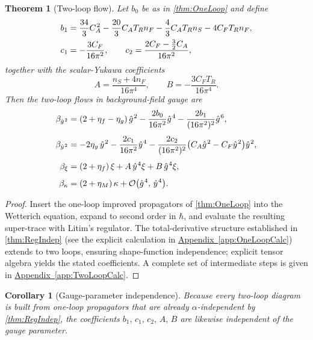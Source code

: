 \documentclass[pdflatex,sn-mathphys-num]{sn-jnl}
\theoremstyle{thmstyleone}
\newtheorem{theorem}{Theorem}
\newtheorem{corollary}{Corollary}
\theoremstyle{thmstyletwo}%
\theoremstyle{thmstylethree}%
\newcommand{\sm}{\hspace{.065em}}
\newcommand{\appref}[1]{\hyperref[#1]{Appendix~\ref*{#1}}}
\newcommand{\smexp}[1]{^{\sm #1}}
\begin{document}
\begin{theorem}[Two-loop flow]\label{thm:TwoLoop}
Let \(b_{0}\) be as in \autoref{thm:OneLoop} and define
\[
  \begin{aligned}
  &b_{1}
  =\frac{34}{3}C_{A}\smexp{2}
   -\frac{20}{3}C_{A}T_{R}n_{F}
   -\frac43 C_{A}T_{R}n_{S}
   -4C_{F}T_{R}n_{F},\\
  &c_{1}=-\frac{3C_{F}}{16\pi^{2}},\qquad
  c_{2}=\frac{2C_{F}-\tfrac32 C_{A}}{16\pi^{2}},
  \end{aligned}
\]
together with the scalar-Yukawa coefficients
\[
  A=\frac{n_{S}+4n_{F}}{16\pi^{4}},\qquad
  B=-\frac{3C_{F}T_{R}}{16\pi^{4}}.
\]
Then the two-loop flows in background-field gauge are
\begin{equation}\label{eq:beta_g_two}
  \begin{aligned}
  \beta_{\hat g\smexp{2}}
    &=(2+\eta_{f}-\eta_{g})\,\hat g\smexp{2}
      -\frac{2b_{0}}{16\pi^{2}}\hat g\smexp{4}
      -\frac{2b_{1}}{(16\pi^{2})^{2}}\hat g\smexp{6},\\[4pt]
  \beta_{\hat y\smexp{2}}
    &=-2\eta_{y}\,\hat y\smexp{2}
      -\frac{2c_{1}}{16\pi^{2}}\hat y\smexp{4}
      -\frac{2c_{2}}{(16\pi^{2})^{2}}
         \bigl(C_{A}\hat g\smexp{2}-C_{F}\hat y\smexp{2}\bigr)\hat y\smexp{2},
  \\[4pt]
  \beta_{\xi}
    &=(2+\eta_{f})\,\xi
      +A\,\hat y\smexp{4}\xi
      +B\,\hat g\smexp{4}\xi,
  \\[4pt]
  \beta_{\kappa}
    &=(2+\eta_{M})\,\kappa
      +\mathcal O\bigl(\hat g\smexp{4},\,\hat y\smexp{4}\bigr).
  \end{aligned}
\end{equation}
\end{theorem}

\begin{proof}
Insert the one-loop improved propagators of
\autoref{thm:OneLoop} into the Wetterich equation, expand to second order
in \(\hbar\), and evaluate the resulting super-trace with Litim's
regulator.  The total-derivative structure established in
\autoref{thm:RegIndep} (see the explicit calculation in
\appref{app:OneLoopCalc}) extends to two loops, ensuring
shape-function independence; explicit tensor algebra yields the stated
coefficients.  A complete set of intermediate steps is given in
\appref{app:TwoLoopCalc}.
\end{proof}

\begin{corollary}[Gauge-parameter independence]
Because every two-loop diagram is built from one-loop propagators that
are already \(\alpha\)-independent by \autoref{thm:RegIndep},
the coefficients \(b_{1},\,c_{1},\,c_{2},\,A,\,B\) are likewise independent of
the gauge parameter.
\end{corollary}
\end{document}
